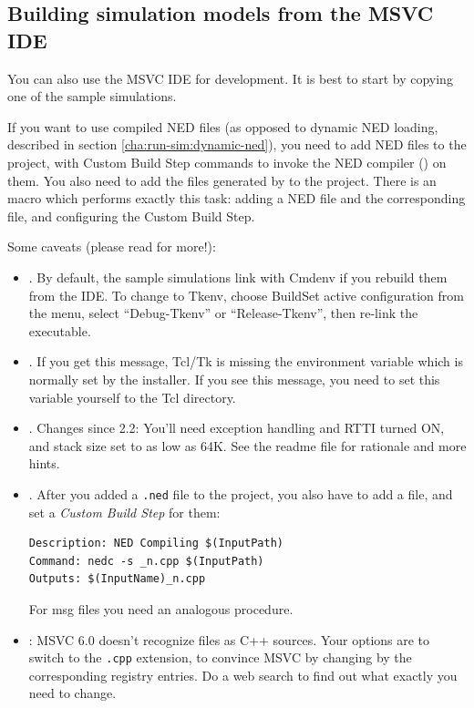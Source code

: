 \subsection{Building simulation models from the MSVC IDE}

You can also use the MSVC IDE for development.
It is best to start by copying one of the sample simulations.

If you want to use compiled NED files (as opposed to dynamic
NED loading, described in section \ref{cha:run-sim:dynamic-ned}),
you need to add NED files to the project, with Custom Build Step
commands to invoke the NED compiler () on them.
You also need to add the  files generated by 
to the project. There is an 
macro which performs exactly this task: adding a NED file and
the corresponding  file, and configuring
the Custom Build Step.


Some caveats (please read  for more!):

\begin{itemize}
 \item {}. By default,
   the sample simulations link with Cmdenv if you rebuild them
   from the IDE. To change to Tkenv, choose Build{\textbar}Set
   active configuration from the menu, select ``Debug-Tkenv''
   or ``Release-Tkenv'', then re-link the executable.

 \item {}. If you get this message,
   Tcl/Tk is missing the  environment variable
   which is normally set by the installer. If you see this message,
   you need to set this variable yourself to the Tcl  directory.

 \item {}. Changes since {\opp} 2.2:
   You'll need exception handling and RTTI turned ON, and
   stack size set to as low as 64K.
   See the readme file for rationale and more hints.

 \item {}. After you added a \texttt{.ned} file
   to the project, you also have to add a  file, and set a
   \textit{Custom Build Step} for them:

\begin{verbatim}
Description: NED Compiling $(InputPath)
Command: nedc -s _n.cpp $(InputPath)
Outputs: $(InputName)_n.cpp
\end{verbatim}

   For msg files you need an analogous procedure.

 \item {}: MSVC 6.0 doesn't recognize  files
   as C++ sources. Your options are to switch to the \texttt{.cpp} extension,
   to convince MSVC by changing by the corresponding registry entries.
   Do a web search to find out what exactly you need to change.

\end{itemize}


